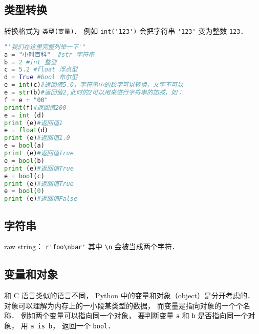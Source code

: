 \subsection{类型转换}
转换格式为 \verb|类型(变量)|． 例如 \verb|int('123')| 会把字符串 \verb|'123'| 变为整数 \verb|123|．
\begin{lstlisting}[language=python]
"'我们在这里完整列举一下'"
a = "小时百科"  #str 字符串
b = 2 #int 整型
c = 5.2 #float 浮点型
d = True #bool 布尔型
e = int(c)#返回值5.0，字符串中的数字可以转换，文字不可以
e = str(b)#返回值2,此时的2可以用来进行字符串的加减，如：
f = e + "00"
print(f)#返回值200
e = int (d)
print (e)#返回值1
e = float(d)
print (e)#返回值1.0
e = bool(a)
print (e)#返回值True
e = bool(b)
print (e)#返回值True
e = bool(c)
print (e)#返回值True
e = bool(0)
print (e)#返回值False
\end{lstlisting}
\subsection{字符串}
raw string： \verb|r'foo\nbar'| 其中 \verb|\n| 会被当成两个字符．

\subsection{变量和对象}
和 C 语言类似的语言不同， Python 中的变量和对象（object）是分开考虑的． 对象可以理解为内存上的一小段某类型的数据， 而变量是指向对象的一个个名称． 例如两个变量可以指向同一个对象， 要判断变量 \verb|a| 和 \verb|b| 是否指向同一个对象， 用 \verb|a is b|， 返回一个 \verb|bool|．
